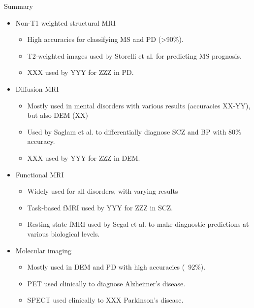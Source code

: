 \documentclass[10pt]{beamer}
\begin{document}
    \begin{frame}{Summary}
        \begin{itemize}
            \setlength\itemsep{-0.3em}
            \item \footnotesize{Non-T1 weighted structural MRI}
            \begin{itemize}
                \item \scriptsize{High accuracies for classifying MS and PD (>90\%).}
                \item \scriptsize{T2-weighted images used by Storelli et al. for predicting MS prognosis.}
                \item \scriptsize{XXX used by YYY for ZZZ in PD.}
            \end{itemize}
            \item \footnotesize{Diffusion MRI}
            \begin{itemize}
                \item \scriptsize{Mostly used in mental disorders with various results (accuracies XX-YY), but also DEM (XX)}
                \item \scriptsize{Used by Saglam et al. to differentially diagnose SCZ and BP with 80\% accuracy.}
                \item \scriptsize{XXX used by YYY for ZZZ in DEM.}
            \end{itemize}
            \item \footnotesize{Functional MRI}
            \begin{itemize}
                \item \scriptsize{Widely used for all disorders, with varying results}
                \item \scriptsize{Task-based fMRI used by YYY for ZZZ in SCZ.}
                \item \scriptsize{Resting state fMRI used by Segal et al. to make diagnostic predictions at various biological levels.}
            \end{itemize}
            \item \footnotesize{Molecular imaging}
            \begin{itemize}
                \item \scriptsize{Mostly used in DEM and PD with high accuracies (~92\%).}
                \item \scriptsize{PET used clinically to diagnose Alzheimer's disease.}
                \item \scriptsize{SPECT used clinically to XXX Parkinson's disease.}
            \end{itemize}
        \end{itemize}
    \end{frame}
\end{document}
